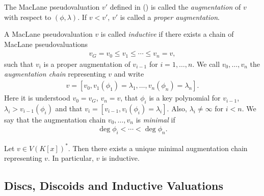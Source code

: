 \begin{definition}
    The MacLane pseudovaluation $v'$ defined in () is called the \textit{augmentation} of $v$ with respect to $(\phi,\lambda)$.
    If $v < v'$, $v'$ is called a \textit{proper augmentation}.
\end{definition}

\begin{definition}
    A MacLane pseudovaluation $v$ is called \textit{inductive} if there exists a chain of MacLane pseudovaluations
    \begin{align}
        v_{\scriptscriptstyle G} = v_0 \leq v_1 \leq \cdots \leq v_n = v,
    \end{align}
    such that $v_i$ is a proper augmentation of $v_{i-1}$ for $i=1,\dots, n$.
    We call $v_0,\dots,v_n$ the \textit{augmentation chain} representing $v$ and write \begin{align}
        v = [v_0,v_1(\phi_1) = \lambda_1,\dots, v_n(\phi_n) = \lambda_n].
    \end{align}
    Here it is understood $v_0 = v_{\scriptscriptstyle G}$, $v_n = v$, that $\phi_i$ is a key polynomial for $v_{i-1}$, $\lambda_i > v_{i-1}(\phi_i)$
    and that $v_i = [v_{i-1}, v_i(\phi_i) = \lambda_i]$. 
    Also, $\lambda_i \neq \infty$ for $i < n$.
    We say that the augmentation chain $v_0,\dots,v_n$ is \textit{minimal} if
    \begin{align}
        \deg \phi_i < \cdots < \deg \phi_n.
    \end{align}
\end{definition}

\begin{theorem}
    Let $v \in V(K[x])^*$.
    Then there exists a unique minimal augmentation chain representing $v$.
    In particular, $v$ is inductive.
\end{theorem}


\subsection{Discs, Discoids and Inductive Valuations}

